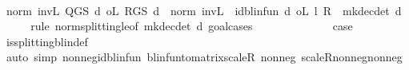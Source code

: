 \begin{isabellebody}
%
\isadelimproof
%
\endisadelimproof
%
\isatagproof
{}\isamarkupfalse%
\ {\isacharminus}{\kern0pt}\isanewline
\ \ \isamarkupfalse%
\ {\isachardoublequoteopen}norm\ {\isacharparenleft}{\kern0pt}inv\isactrlsub L\ {\isacharparenleft}{\kern0pt}Q{\isacharunderscore}{\kern0pt}GS\ d{\isacharparenright}{\kern0pt}\ o\isactrlsub L\ R{\isacharunderscore}{\kern0pt}GS\ d{\isacharparenright}{\kern0pt}\ {\isasymle}\ norm\ {\isacharparenleft}{\kern0pt}inv\isactrlsub L\ {\isacharparenleft}{\kern0pt}{\isacharparenleft}{\kern0pt}{\isasymlambda}{\isacharunderscore}{\kern0pt}{\isachardot}{\kern0pt}\ id{\isacharunderscore}{\kern0pt}blinfun{\isacharparenright}{\kern0pt}\ d{\isacharparenright}{\kern0pt}\ o\isactrlsub L\ {\isacharparenleft}{\kern0pt}l\ {\isacharasterisk}{\kern0pt}\isactrlsub R\ {\isasymP}\ {\isacharparenleft}{\kern0pt}mk{\isacharunderscore}{\kern0pt}dec{\isacharunderscore}{\kern0pt}det\ d{\isacharparenright}{\kern0pt}{\isacharparenright}{\kern0pt}{\isacharparenright}{\kern0pt}\ {\isachardoublequoteclose}\isanewline
\ \ \isamarkupfalse%
\ {\isacharparenleft}{\kern0pt}rule\ norm{\isacharunderscore}{\kern0pt}splitting{\isacharunderscore}{\kern0pt}le{\isacharbrackleft}{\kern0pt}of\ {\isachardoublequoteopen}mk{\isacharunderscore}{\kern0pt}dec{\isacharunderscore}{\kern0pt}det\ d{\isachardoublequoteclose}{\isacharbrackright}{\kern0pt}{\isacharcomma}{\kern0pt}\ goal{\isacharunderscore}{\kern0pt}cases{\isacharparenright}{\kern0pt}\isanewline
\ \ \ \ \isamarkupfalse%
\ {}\isanewline
\ \ \ \ \isamarkupfalse%
\ \isamarkupfalse%
\ {\isacharquery}{\kern0pt}case\ \isanewline
\ \ \ \ \ \ \isamarkupfalse%
\ is{\isacharunderscore}{\kern0pt}splitting{\isacharunderscore}{\kern0pt}blin{\isacharunderscore}{\kern0pt}def{\isacharprime}{\kern0pt}\isanewline
\ \ \ \ \ \ \isamarkupfalse%
\ {\isacharparenleft}{\kern0pt}auto\ simp{\isacharcolon}{\kern0pt}\ nonneg{\isacharunderscore}{\kern0pt}id{\isacharunderscore}{\kern0pt}blinfun\ blinfun{\isacharunderscore}{\kern0pt}to{\isacharunderscore}{\kern0pt}matrix{\isacharunderscore}{\kern0pt}scaleR\ nonneg{\isacharunderscore}{\kern0pt}{\isasymP}\ scaleR{\isacharunderscore}{\kern0pt}nonneg{\isacharunderscore}{\kern0pt}nonneg{\isacharparenright}{\kern0pt}\isanewline
\ \ \isamarkupfalse%
\isanewline
\ \ \ \ \isamarkupfalse%
\ {}\isanewline
\ \ \ \ \isamarkupfalse%
\ \isamarkupfalse%

\end{isabellebody}
